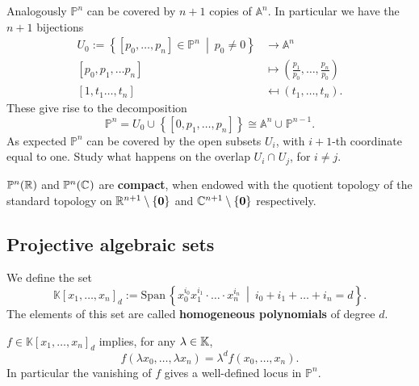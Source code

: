 \begin{rem}
	Analogously $\mathbb{P}^n$ can be covered by $n+1$ copies of $\mathbb{A}^n$.
	In particular we have the $n+1$ bijections
	\begin{align}
		U_0 := \left\{ \left[ p_0, \ldots, p_n \right] \in \mathbb{P}^n \ \middle|\ p_0 \neq 0 \right\} &\to \mathbb{A}^n \\
		\left[ p_0, p_1, \ldots p_n \right] &\mapsto \left( \frac{p_1}{p_0}, \ldots, \frac{p_n}{p_0} \right)\\
		\left[ 1, t_1 \ldots, t_n \right] &\mapsfrom \left( t_1, \ldots, t_n \right)
	.\end{align} 
	These give rise to the decomposition
	\begin{equation}
	\mathbb{P}^n = U_0 \cup_{} \left\{ \left[ 0, p_1 , \ldots , p_n \right] \right\} \cong \mathbb{A}^n \cup_{} \mathbb{P}^{n-1} 
	.\end{equation} 
	As expected $\mathbb{P}^n$ can be covered by the open subsets $U_i$, with $i+1$-th coordinate equal to one.
	Study what happens on the overlap $U_i \cap_{} U_j$, for $i \neq j$.
\end{rem}

\begin{rem}
	$\mathbb{P}^n(\mathbb{R})$ and $\mathbb{P}^n(\mathbb{C}^{})$ are \textbf{compact}, when endowed with the quotient topology of the standard topology on $\mathbb{R}^{n+1} \setminus \left\{ \mathbf{0} \right\}$ and $\mathbb{C}^{n+1}\setminus \left\{ \mathbf{0} \right\}$ respectively.
\end{rem}

\subsection{Projective algebraic sets}
\begin{defn}
	We define the set
	\begin{equation}
	\mathbb{K}\left[x_1, \ldots, x_n \right]_d := \mathrm{Span}\, \left\{ x_0^{i_0}x_1^{i_1}\cdot \ldots \cdot x_n^{i_n} \ \middle|\ i_0 + i_1 + \ldots + i_n = d \right\}
	.\end{equation} 
	The elements of this set are called \textbf{homogeneous polynomials} of degree $d$.
\end{defn}

\begin{rem}
	$f \in \mathbb{K}\left[x_1, \ldots, x_n \right]_d$ implies, for any $\lambda \in \mathbb{K}$,
	 \begin{equation}
	f \left( \lambda x_0, \ldots, \lambda x_n \right) = \lambda^d f \left( x_0, \ldots, x_n \right)
	.\end{equation} 
	In particular the vanishing of $f$ gives a well-defined locus in $\mathbb{P}^n$.
\end{rem}

